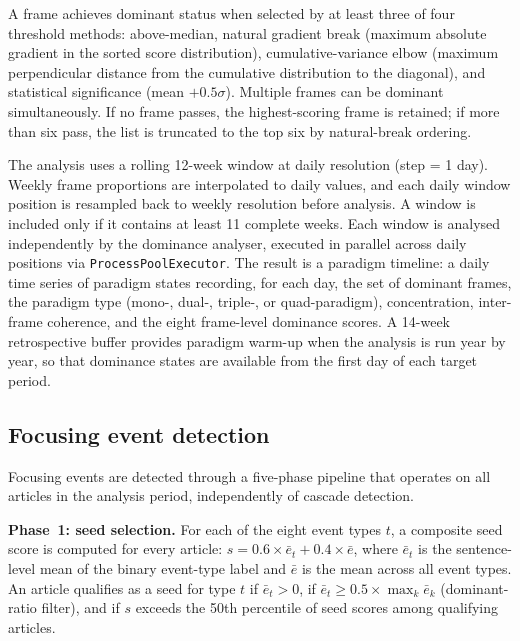 A frame achieves dominant status when selected by at least three of four threshold methods: above-median, natural gradient break (maximum absolute gradient in the sorted score distribution), cumulative-variance elbow (maximum perpendicular distance from the cumulative distribution to the diagonal), and statistical significance (mean $+ 0.5\sigma$). Multiple frames can be dominant simultaneously. If no frame passes, the highest-scoring frame is retained; if more than six pass, the list is truncated to the top six by natural-break ordering.

The analysis uses a rolling 12-week window at daily resolution (step = 1 day). Weekly frame proportions are interpolated to daily values, and each daily window position is resampled back to weekly resolution before analysis. A window is included only if it contains at least 11 complete weeks. Each window is analysed independently by the dominance analyser, executed in parallel across daily positions via \texttt{ProcessPoolExecutor}. The result is a paradigm timeline: a daily time series of paradigm states recording, for each day, the set of dominant frames, the paradigm type (mono-, dual-, triple-, or quad-paradigm), concentration, inter-frame coherence, and the eight frame-level dominance scores. A 14-week retrospective buffer provides paradigm warm-up when the analysis is run year by year, so that dominance states are available from the first day of each target period.

\subsection*{Focusing event detection}

Focusing events are detected through a five-phase pipeline that operates on all articles in the analysis period, independently of cascade detection.

\textbf{Phase~1: seed selection.} For each of the eight event types $t$, a composite seed score is computed for every article: $s = 0.6 \times \bar{e}_t + 0.4 \times \bar{e}$, where $\bar{e}_t$ is the sentence-level mean of the binary event-type label and $\bar{e}$ is the mean across all event types. An article qualifies as a seed for type $t$ if $\bar{e}_t > 0$, if $\bar{e}_t \geq 0.5 \times \max_k \bar{e}_k$ (dominant-ratio filter), and if $s$ exceeds the 50th percentile of seed scores among qualifying articles.

